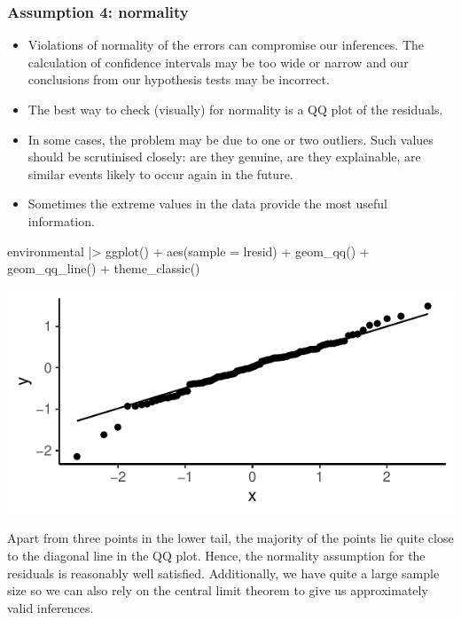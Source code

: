 \documentclass[a4paper]{article}
\begin{document}
\subsubsection{Assumption 4: normality}
\begin{itemize}
	\item Violations of normality of the errors can compromise our inferences. The calculation of confidence intervals may be too wide or narrow and our conclusions from our hypothesis tests may be incorrect.
	\item The best way to check (visually) for normality is a QQ plot of the residuals.
	\item In some cases, the problem may be due to one or two outliers. Such values should be scrutinised closely: are they genuine, are they explainable, are similar events likely to occur again in the future.
	\item Sometimes the extreme values in the data provide the most useful information.
\end{itemize}
\begin{Schunk}
\begin{Sinput}
environmental |> ggplot() + 
  aes(sample = lresid) +
  geom_qq() + geom_qq_line() +
  theme_classic()
\end{Sinput}


{\centering \includegraphics[width=\maxwidth]{figure/listings-unnamed-chunk-352-1} 

}

\end{Schunk}
Apart from three points in the lower tail, the majority of the points lie quite close to the diagonal line in the QQ plot. Hence, the normality assumption for the residuals is reasonably well satisfied.
Additionally, we have quite a large sample size so we can also rely on the central limit theorem to give us approximately valid inferences.
\end{document}
